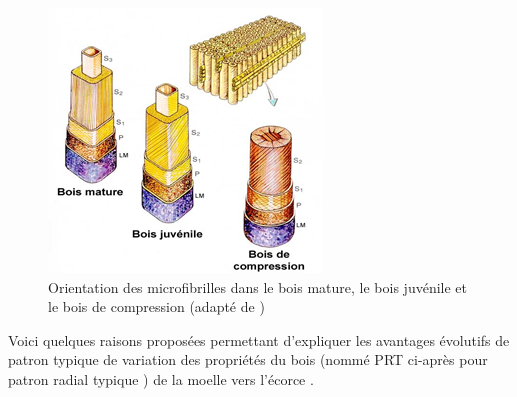 \begin{figure}[!h]
	\centering
	\includegraphics[width=0.5\linewidth]{./img/ch8_juv_comp}
	\caption{Orientation des microfibrilles dans le bois mature, le bois juvénile et le bois de compression (adapté de \cite{jozsa1994discussion})}
	\label{fig:juv_comp}
\end{figure}


Voici quelques raisons proposées permettant d'expliquer les avantages évolutifs de patron typique de variation des propriétés du bois (nommé PRT ci-après pour \og patron radial typique \fg) de la moelle vers l'écorce \citep{lachenbruch2011radial}.

